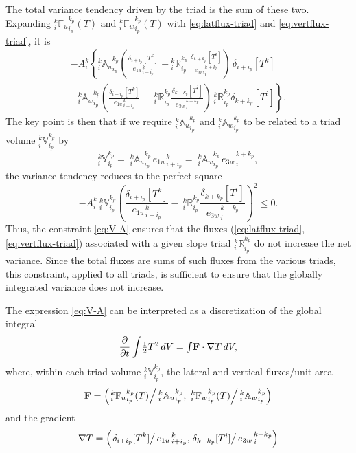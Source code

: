\documentclass[../main/NEMO_manual]{subfiles}
\begin{document}
The total variance tendency driven by the triad is the sum of these two.
Expanding $_i^k{\mathbb{F}_u}_{i_p}^{k_p} (T)$ and $_i^k{\mathbb{F}_w}_{i_p}^{k_p} (T)$ with
\autoref{eq:latflux-triad} and \autoref{eq:vertflux-triad}, it is
\begin{multline*}
  -{A}_i^k\left \{
    { } _i^k{\mathbb{A}_u}_{i_p}^{k_p}
    \left(
      \frac{ \delta_{i+ i_p}[T^k] }{ {e_{1u}}_{\,i + i_p}^{\,k} }
      - {_i^k\mathbb{R}_{i_p}^{k_p}} \
      \frac{ \delta_{k+k_p} [T^i] }{{e_{3w}}_{\,i}^{\,k+k_p} }\right)\,\delta_{i+ i_p}[T^k] \right.\\
  - \left. { } _i^k{\mathbb{A}_w}_{i_p}^{k_p}
    \left(
      \frac{ \delta_{i+ i_p}[T^k] }{ {e_{1u}}_{\,i + i_p}^{\,k} }
      -{\:}_i^k\mathbb{R}_{i_p}^{k_p}
      \frac{ \delta_{k+k_p} [T^i] }{{e_{3w}}_{\,i}^{\,k+k_p} }
    \right) {\,}_i^k\mathbb{R}_{i_p}^{k_p}\delta_{k+ k_p}[T^i]
  \right \}.
\end{multline*}
The key point is then that if we require $_i^k{\mathbb{A}_u}_{i_p}^{k_p}$ and $_i^k{\mathbb{A}_w}_{i_p}^{k_p}$ to
be related to a triad volume $_i^k\mathbb{V}_{i_p}^{k_p}$ by
\begin{equation}
  \label{eq:V-A}
  _i^k\mathbb{V}_{i_p}^{k_p}
  ={\;}_i^k{\mathbb{A}_u}_{i_p}^{k_p}\,{e_{1u}}_{\,i + i_p}^{\,k}
  ={\;}_i^k{\mathbb{A}_w}_{i_p}^{k_p}\,{e_{3w}}_{\,i}^{\,k + k_p},
\end{equation}
the variance tendency reduces to the perfect square
\begin{equation}
  \label{eq:perfect-square}
  -{A}_i^k{\:} _i^k\mathbb{V}_{i_p}^{k_p}
  \left(
    \frac{ \delta_{i+ i_p}[T^k] }{ {e_{1u}}_{\,i + i_p}^{\,k} }
    -{\:}_i^k\mathbb{R}_{i_p}^{k_p}
    \frac{ \delta_{k+k_p} [T^i] }{{e_{3w}}_{\,i}^{\,k+k_p} }
  \right)^2\leq 0.
\end{equation}
Thus, the constraint \autoref{eq:V-A} ensures that the fluxes
(\autoref{eq:latflux-triad}, \autoref{eq:vertflux-triad}) associated with
a given slope triad $_i^k\mathbb{R}_{i_p}^{k_p}$ do not increase the net variance.
Since the total fluxes are sums of such fluxes from the various triads, this constraint, applied to all triads,
is sufficient to ensure that the globally integrated variance does not increase.

The expression \autoref{eq:V-A} can be interpreted as a discretization of the global integral
\begin{equation}
  \label{eq:cts-var}
  \frac{\partial}{\partial t}\int\!\textstyle \frac{1}{2} T^2\, dV =
  \int\!\mathbf{F}\cdot\nabla T\, dV,
\end{equation}
where, within each triad volume $_i^k\mathbb{V}_{i_p}^{k_p}$, the lateral and vertical fluxes/unit area
\[
  \mathbf{F}=\left(
    \left.{}_i^k{\mathbb{F}_u}_{i_p}^{k_p} (T)\right/{}_i^k{\mathbb{A}_u}_{i_p}^{k_p},
    \left.{\:}_i^k{\mathbb{F}_w}_{i_p}^{k_p} (T)\right/{}_i^k{\mathbb{A}_w}_{i_p}^{k_p}
  \right)
\]
and the gradient
\[
  \nabla T = \left(
    \left.\delta_{i+ i_p}[T^k] \right/ {e_{1u}}_{\,i + i_p}^{\,k},
    \left.\delta_{k+ k_p}[T^i] \right/ {e_{3w}}_{\,i}^{\,k + k_p}
  \right)
\]
\end{document}
